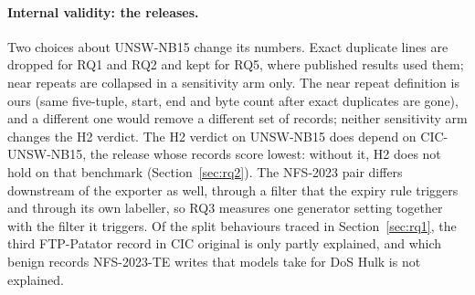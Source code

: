 \paragraph{Internal validity: the releases.} Two choices about UNSW-NB15 change its numbers. Exact duplicate lines are dropped for RQ1 and RQ2 and kept for RQ5, where published results used them; near repeats are collapsed in a sensitivity arm only. The near repeat definition is ours (same five-tuple, start, end and byte count after exact duplicates are gone), and a different one would remove a different set of records; neither sensitivity arm changes the H2 verdict. The H2 verdict on UNSW-NB15 does depend on CIC-UNSW-NB15, the release whose records score lowest: without it, H2 does not hold on that benchmark (Section~\ref{sec:rq2}). The NFS-2023 pair differs downstream of the exporter as well, through a filter that the expiry rule triggers and through its own labeller, so RQ3 measures one generator setting together with the filter it triggers. Of the split behaviours traced in Section~\ref{sec:rq1}, the third FTP-Patator record in CIC original is only partly explained, and which benign records NFS-2023-TE writes that models take for DoS Hulk is not explained.

